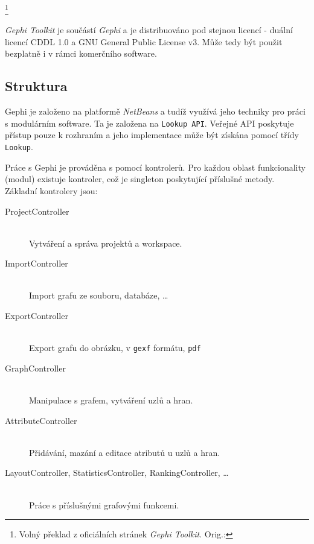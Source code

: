 \documentclass[thesis=M,czech]{FITthesis}[2014/05/6]
\begin{document}
\textit{}\footnote{Volný překlad z oficiálních stránek \textit{Gephi Toolkit}\cite{gephi:toolkit}. Orig.:
}

\textit{Gephi Toolkit} je součástí \textit{Gephi} a je distribuováno pod stejnou licencí - duální licencí CDDL 1.0 a GNU General Public License v3.
Může tedy být použit bezplatně i v rámci komerčního software.

\subsection{Struktura}
Gephi je založeno na platformě \textit{NetBeans} a tudíž využívá jeho techniky pro práci s modulárním software. Ta je založena na 
\texttt{Lookup API}. Veřejné API poskytuje přístup pouze k rozhraním a jeho implementace může být získána pomocí třídy \texttt{Lookup}.



Práce s Gephi je prováděna s pomocí kontrolerů. Pro každou oblast funkcionality (modul) existuje kontroler, což je 
singleton poskytující příslušné metody. Základní kontrolery jsou:

\begin{description}
  \item[ProjectController] \hfill \\
  Vytváření a správa projektů a workspace.
  \item[ImportController] \hfill \\
  Import grafu ze souboru, databáze, \ldots
  \item[ExportController] \hfill \\
  Export grafu do obrázku, v \texttt{gexf} formátu, \texttt{pdf}
  \item[GraphController] \hfill \\
  Manipulace s grafem, vytváření uzlů a hran.
 \item[AttributeController] \hfill \\
  Přidávání, mazání a editace atributů u uzlů a hran.
  \item[LayoutController, StatisticsController, RankingController, \ldots] \hfill \\
  Práce s příslušnými grafovými funkcemi.
\end{description}
\end{document}
